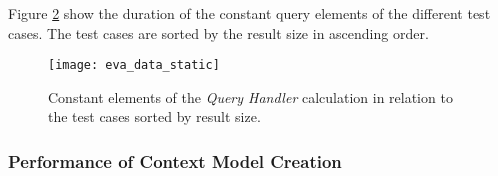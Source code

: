\documentclass[draft,final]{vutinfth} %
\begin{document}
\begin{itemize}
\begin{figure}[!h]
		\label{fig:evaluation_perf_data_database}	
	\end{figure}
\end{itemize}

Figure \ref{fig:eva_data_static} show the duration of the constant query elements of the different test cases. The test cases are sorted by the result size in ascending order.

\begin{figure}[h]
	\centering
	\texttt{[image: eva\_data\_static]}
	\caption{Constant elements of the \textit{Query Handler} calculation in relation to the test cases sorted by result size.}
	\label{fig:eva_data_static} %
\end{figure}


\subsubsection{Performance of Context Model Creation}\label{Evaluation:impact_perf_context}
\end{document}
